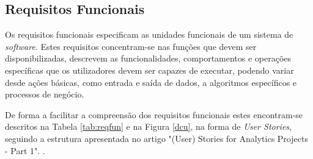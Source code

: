 \subsection{Requisitos Funcionais}
\label{sec:3-rf}

Os requisitos funcionais especificam as unidades funcionais de um sistema de \textit{software}.
Estes requisitos concentram-se nas funções que devem ser disponibilizadas, descrevem as
funcionalidades, comportamentos e operações específicas que os utilizadores devem ser capazes de 
executar, podendo variar desde ações básicas, como entrada e saída de dados, a algoritmos 
específicos e processos de negócio.

De forma a facilitar a compreensão dos requisitos funcionais estes encontram-se descritos na 
Tabela \ref{tab:reqfun} e na Figura \ref{dcu}, na forma de \textit{User Stories}, seguindo a 
estrutura apresentada no artigo "(User) Stories for Analytics Projects - Part 1". \cite{us}.


